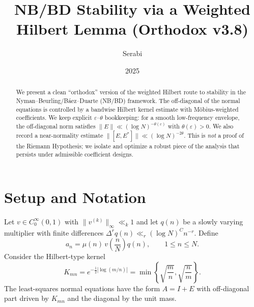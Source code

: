 \documentclass[11pt]{article}
\title{NB/BD Stability via a Weighted Hilbert Lemma (Orthodox v3.8)}
\author{Serabi}
\date{2025}
\theoremstyle{remark}
\begin{document}
\maketitle

\begin{abstract}
We present a clean ``orthodox'' version of the weighted Hilbert route to stability in the
Nyman--Beurling/B\'aez--Duarte (NB/BD) framework. The off-diagonal of the normal equations
is controlled by a bandwise Hilbert kernel estimate with M\"obius-weighted coefficients.
We keep explicit $\varepsilon$--$\theta$ bookkeeping: for a smooth low-frequency envelope,
the off-diagonal norm satisfies $\|E\|\ll (\log N)^{-\theta(\varepsilon)}$ with $\theta(\varepsilon)>0$.
We also record a near-normality estimate $\|[E,E^\ast]\|\ll (\log N)^{-2\theta}$.
This is \emph{not} a proof of the Riemann Hypothesis; we isolate and optimize a robust
piece of the analysis that persists under admissible coefficient designs.
\end{abstract}

\section{Setup and Notation}
Let $v\in C_0^\infty(0,1)$ with $\|v^{(k)}\|_\infty\ll_k 1$ and let $q(n)$ be a slowly varying
multiplier with finite differences $\Delta^r q(n)\ll_r (\log N)^C n^{-r}$.
Define
\begin{equation}
a_n=\mu(n)\,v\!\left(\frac{n}{N}\right) q(n),\qquad 1\le n\le N.
\end{equation}
Consider the Hilbert-type kernel
\begin{equation}
K_{mn}=e^{-\frac12|\log(m/n)|}=\min\!\left\{\sqrt{\frac{m}{n}},\sqrt{\frac{n}{m}}\right\}.
\end{equation}
The least-squares normal equations have the form $A=I+E$ with off-diagonal part driven by
$K_{mn}$ and the diagonal by the unit mass.
\end{document}

